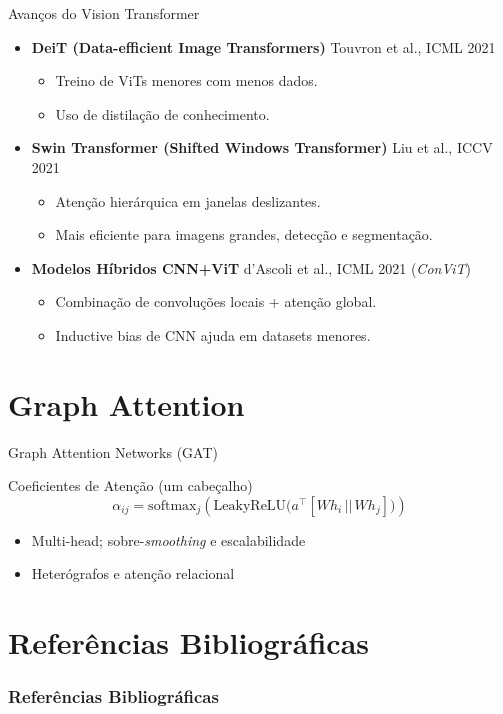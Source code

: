 \documentclass{beamer}
\begin{document}
\begin{frame}{Avanços do Vision Transformer}
\begin{itemize}
    \item \textbf{DeiT (Data-efficient Image Transformers)}  
    Touvron et al., ICML 2021  
    \begin{itemize}
        \item Treino de ViTs menores com menos dados.
        \item Uso de distilação de conhecimento.
    \end{itemize}

    \vspace{0.2cm}

    \item \textbf{Swin Transformer (Shifted Windows Transformer)}  
    Liu et al., ICCV 2021  
    \begin{itemize}
        \item Atenção hierárquica em janelas deslizantes.
        \item Mais eficiente para imagens grandes, detecção e segmentação.
    \end{itemize}

    \vspace{0.2cm}

    \item \textbf{Modelos Híbridos CNN+ViT}  
    d’Ascoli et al., ICML 2021 (\textit{ConViT})  
    \begin{itemize}
        \item Combinação de convoluções locais + atenção global.
        \item Inductive bias de CNN ajuda em datasets menores.
    \end{itemize}
\end{itemize}
\end{frame}

\section{Graph Attention}
\begin{frame}{Graph Attention Networks (GAT)}
	\begin{block}{Coeficientes de Atenção (um cabeçalho)}
		\small
		\[
			\alpha_{ij}=\mathrm{softmax}_j\!\left(\mathrm{LeakyReLU}\!\big(a^\top[Wh_i \,||\, Wh_j]\big)\right)
		\]
	\end{block}
	\begin{itemize}
		\item Multi-head; sobre-\textit{smoothing} e escalabilidade
		\item Heterógrafos e atenção relacional
	\end{itemize}
\end{frame}

\section{Referências Bibliográficas}
\begin{frame}[allowframebreaks]
	\frametitle{Referências Bibliográficas}
	
	
\end{frame}
\end{document}
